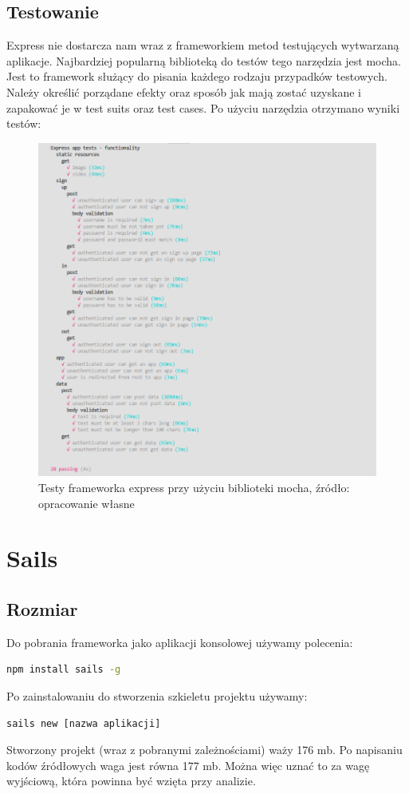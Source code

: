 \documentclass[12pt]{report}
\begin{document}
    \subsection{Testowanie}
      Express nie dostarcza nam wraz z frameworkiem metod testujących wytwarzaną aplikacje. 
      Najbardziej popularną biblioteką do testów tego narzędzia jest mocha.
      Jest to framework służący do pisania każdego rodzaju przypadków testowych.
      Należy określić porządane efekty oraz sposób jak mają zostać uzyskane i zapakować je w test suits oraz test cases.
      Po użyciu narzędzia otrzymano wyniki testów:
      \begin{figure}[!hb]
        \centering
        \includegraphics[width=\textwidth,height=\textheight,keepaspectratio]{test_express.png} 
        \caption{Testy frameworka express przy użyciu biblioteki mocha, źródło: opracowanie własne}
      \end{figure}

  \section{Sails}
    \subsection{Rozmiar}
      Do pobrania frameworka jako aplikacji konsolowej używamy polecenia:
      \begin{lstlisting}[language=bash,numbers=none]
        npm install sails -g
      \end{lstlisting}
      Po zainstalowaniu do stworzenia szkieletu projektu używamy:
      \begin{lstlisting}[language=bash,numbers=none]
        sails new [nazwa aplikacji]
      \end{lstlisting}
      Stworzony projekt (wraz z pobranymi zależnościami) waży 176 mb.
      Po napisaniu kodów źródłowych waga jest równa 177 mb.
      Można więc uznać to za wagę wyjściową, która powinna być wzięta przy analizie.
\end{document}
